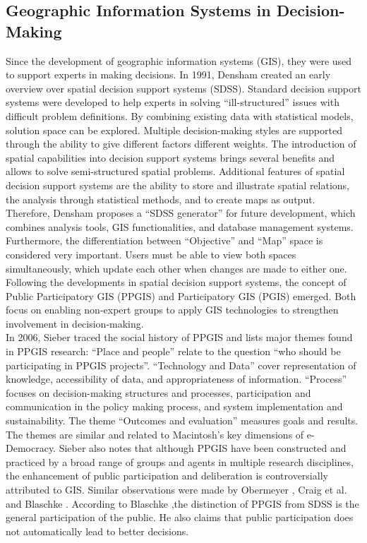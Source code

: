 \subsection{Geographic Information Systems in Decision-Making}
\label{subchap:gis_stuff}
Since the development of geographic information systems (GIS), they were used to support experts in making decisions. In 1991, Densham \cite{densham_sdss} created an early overview over spatial decision support systems (SDSS). Standard decision support systems were developed to help experts in solving ``ill-structured'' issues with difficult problem definitions. By combining existing data with statistical models, solution space can be explored. Multiple decision-making styles are supported through the ability to give different factors different weights. The introduction of spatial capabilities into decision support systems brings several benefits and allows to solve semi-structured spatial problems. Additional features of spatial decision support systems are the ability to store and illustrate spatial relations, the analysis through statistical methods, and to create maps as output. Therefore, Densham proposes a ``SDSS generator'' for future development, which combines analysis tools, GIS functionalities, and database management systems. Furthermore, the differentiation between ``Objective'' and ``Map'' space is considered very important. Users must be able to view both spaces simultaneously, which update each other when changes are made to either one.\\
Following the developments in spatial decision support systems, the concept of Public Participatory GIS (PPGIS) and Participatory GIS (PGIS) emerged. Both focus on enabling non-expert groups to apply GIS technologies to strengthen involvement in decision-making.\\
In 2006, Sieber \cite{Sieber2006_PublicParticipationGIS} traced the social history of PPGIS and lists major themes found in PPGIS research: ``Place and people'' relate to the question ``who should be participating in PPGIS projects''. ``Technology and Data'' cover representation of knowledge, accessibility of data, and appropriateness of information. ``Process'' focuses on decision-making structures and processes, participation and communication in the policy making process, and system implementation and sustainability. The  theme ``Outcomes and evaluation'' measures goals and results. The themes  are similar and related to Macintosh's \cite{Macintosh2004_eParticipation_characterization} key dimensions of e-Democracy. Sieber also notes that although PPGIS have been constructed and practiced by a broad range of groups and agents in multiple research disciplines, the enhancement of public participation and deliberation is controversially attributed to GIS. Similar observations were made by Obermeyer \cite{obermeyer1998evolution}, Craig et al. \cite{Weiner2002_Participation_and_GIS_eigentlich_Craig} and Blaschke \cite{Blaschke2004_PGIS_critically_revised}. According to Blaschke ,the distinction of PPGIS from SDSS is the general participation of the public. He also claims that public participation does not automatically lead to better decisions.\\

